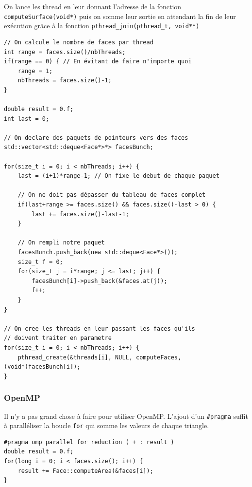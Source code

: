\documentclass[a4paper]{article}
\begin{document}
		On lance les thread en leur donnant l'adresse de la fonction \texttt{computeSurface(void*)} puis on somme leur sortie en attendant la fin de leur exécution grâce à la fonction \texttt{pthread\_join(pthread\_t, void**)}
		\begin{lstlisting}
// On calcule le nombre de faces par thread
int range = faces.size()/nbThreads;
if(range == 0) { // En évitant de faire n'importe quoi
	range = 1;
	nbThreads = faces.size()-1;
}

double result = 0.f;
int last = 0;

// On declare des paquets de pointeurs vers des faces
std::vector<std::deque<Face*>*> facesBunch;

for(size_t i = 0; i < nbThreads; i++) {
    last = (i+1)*range-1; // On fixe le debut de chaque paquet

	// On ne doit pas dépasser du tableau de faces complet
    if(last+range >= faces.size() && faces.size()-last > 0) {
        last += faces.size()-last-1;
    }

	// On rempli notre paquet
    facesBunch.push_back(new std::deque<Face*>());
    size_t f = 0;
    for(size_t j = i*range; j <= last; j++) {
        facesBunch[i]->push_back(&faces.at(j));
        f++;
    }
}

// On cree les threads en leur passant les faces qu'ils
// doivent traiter en parametre
for(size_t i = 0; i < nbThreads; i++) {
    pthread_create(&threads[i], NULL, computeFaces, (void*)facesBunch[i]);
}
		\end{lstlisting}

		\subsubsection{OpenMP}
		Il n'y a pas grand chose à faire pour utiliser OpenMP. L'ajout d'un \texttt{\#pragma} suffit à paralléliser la boucle \texttt{for} qui somme les valeurs de chaque triangle.
		\begin{lstlisting}
#pragma omp parallel for reduction ( + : result )
double result = 0.f;
for(long i = 0; i < faces.size(); i++) {
    result += Face::computeArea(&faces[i]);
}
		\end{lstlisting}
\end{document}

